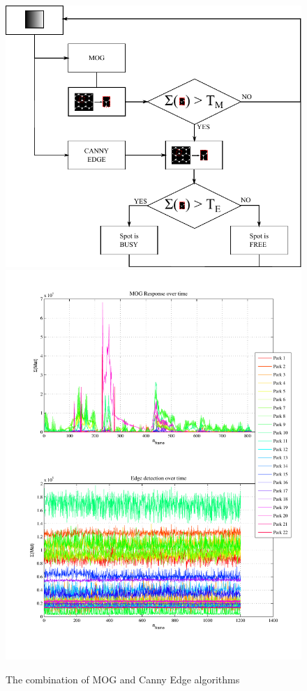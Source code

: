 	\begin{figure}[H] \label{fig:mog}
		\centering
			\includegraphics[keepaspectratio, scale=0.55]{img/mogandedge.pdf}
			\includegraphics[keepaspectratio, scale=0.2]{img/img2.pdf}
		\caption{The combination of MOG and Canny Edge algorithms}
	\end{figure}
	
